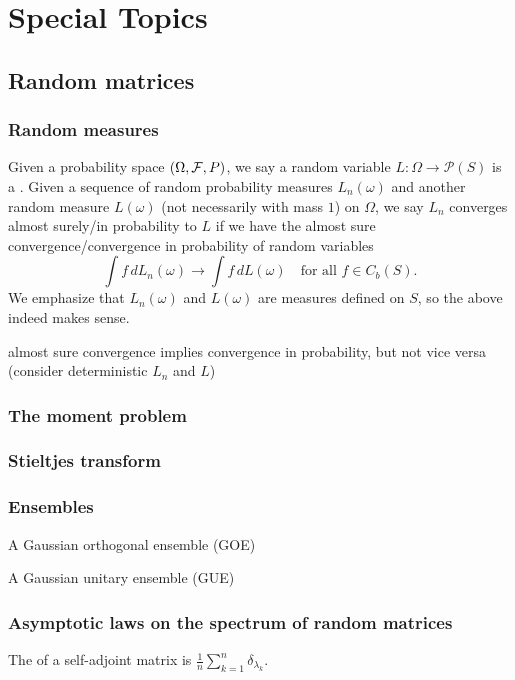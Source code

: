\chapter{Special Topics}
\section{Random matrices}
\subsection{Random measures}
Given a probability space $(\Omega,\mathcal{F}, P)$, we say a random variable $L\colon \Omega \to \mathcal P(S)$ is a . Given a sequence of random probability measures $L_n(\omega)$ and another random measure $L(\omega)$ (not necessarily with mass $1$) on $\Omega$, we say $L_n$ converges almost surely/in probability to $L$ if we have the almost sure convergence/convergence in probability of random variables \[
    \int f \,dL_n(\omega) \to \int f\,dL(\omega)\quad \text{for all }f \in C_b(S).
\] We emphasize that $L_n(\omega)$ and $L(\omega)$ are measures defined on $S$, so the above indeed makes sense.

almost sure convergence implies convergence in probability, but not vice versa (consider deterministic $L_n$ and $L$)


\subsection{The moment problem}

\subsection{Stieltjes transform}

\subsection{Ensembles}
A Gaussian orthogonal ensemble (GOE)

A Gaussian unitary ensemble (GUE)

\subsection{Asymptotic laws on the spectrum of random matrices}

The  of a self-adjoint matrix is $\frac{1}{n}\sum_{k=1}^n \delta_{\lambda_k}$. 

